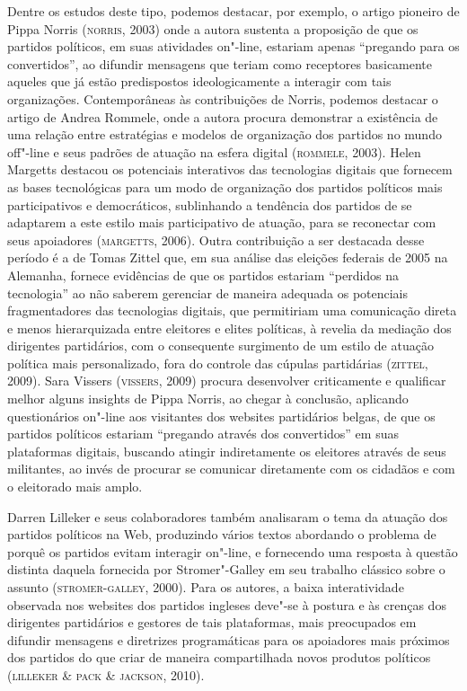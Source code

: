 Dentre os estudos deste tipo, podemos destacar, por exemplo, o artigo
pioneiro de Pippa Norris (\textsc{norris}, 2003) onde a autora sustenta a
proposição de que os partidos políticos, em suas atividades on"-line,
estariam apenas ``pregando para os convertidos'', ao difundir mensagens
que teriam como receptores basicamente aqueles que já estão predispostos
ideologicamente a interagir com tais organizações. Contemporâneas às
contribuições de Norris, podemos destacar o artigo de Andrea Rommele,
onde a autora procura demonstrar a existência de uma relação entre
estratégias e modelos de organização dos partidos no mundo off"-line e
seus padrões de atuação na esfera digital (\textsc{rommele}, 2003). Helen
Margetts destacou os potenciais interativos das tecnologias digitais que
fornecem as bases tecnológicas para um modo de organização dos partidos
políticos mais participativos e democráticos, sublinhando a tendência
dos partidos de se adaptarem a este estilo mais participativo de
atuação, para se reconectar com seus apoiadores (\textsc{margetts}, 2006). Outra
contribuição a ser destacada desse período é a de Tomas Zittel que, em
sua análise das eleições federais de 2005 na Alemanha, fornece
evidências de que os partidos estariam ``perdidos na tecnologia'' ao não
saberem gerenciar de maneira adequada os potenciais fragmentadores das
tecnologias digitais, que permitiriam uma comunicação direta e menos
hierarquizada entre eleitores e elites políticas, à revelia da mediação
dos dirigentes partidários, com o consequente surgimento de um estilo de
atuação política mais personalizado, fora do controle das cúpulas
partidárias (\textsc{zittel}, 2009). Sara Vissers (\textsc{vissers}, 2009) procura
desenvolver criticamente e qualificar melhor alguns insights de Pippa
Norris, ao chegar à conclusão, aplicando questionários on"-line aos
visitantes dos websites partidários belgas, de que os partidos políticos
estariam ``pregando através dos convertidos'' em suas plataformas
digitais, buscando atingir indiretamente os eleitores através de seus
militantes, ao invés de procurar se comunicar diretamente com os
cidadãos e com o eleitorado mais amplo.

Darren Lilleker e seus colaboradores também analisaram o tema da atuação
dos partidos políticos na Web, produzindo vários textos abordando o
problema de porquê os partidos evitam interagir on"-line, e fornecendo
uma resposta à questão distinta daquela fornecida por Stromer"-Galley em
seu trabalho clássico sobre o assunto (\textsc{stromer}-\textsc{galley}, 2000). Para os
autores, a baixa interatividade observada nos websites dos partidos
ingleses deve"-se à postura e às crenças dos dirigentes partidários e
gestores de tais plataformas, mais preocupados em difundir mensagens e
diretrizes programáticas para os apoiadores mais próximos dos partidos
do que criar de maneira compartilhada novos produtos políticos (\textsc{lilleker}
\& \textsc{pack} \& \textsc{jackson}, 2010).

